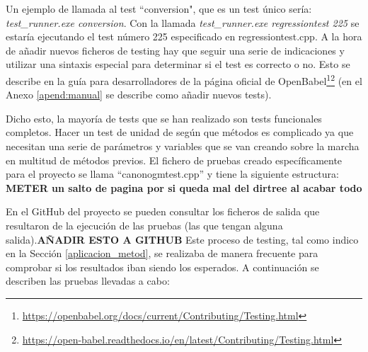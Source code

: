 Un ejemplo de llamada al test ``conversion", que es un test único sería: \textit{test\_runner.exe conversion}. Con la llamada \textit{test\_runner.exe regressiontest 225} se estaría ejecutando el test número 225 especificado en regressiontest.cpp. A la hora de añadir nuevos ficheros de testing hay que seguir una serie de indicaciones y utilizar una sintaxis especial para determinar si el test es correcto o no. Esto se describe en la guía para desarrolladores de la página oficial de OpenBabel\footnote{\url{https://openbabel.org/docs/current/Contributing/Testing.html}}\footnotecomma\footnote{\url{https://open-babel.readthedocs.io/en/latest/Contributing/Testing.html}} (en el Anexo \ref{apend:manual} se describe como añadir nuevos tests).

Dicho esto, la mayoría de tests que se han realizado son tests funcionales completos. Hacer un test de unidad de según que métodos es complicado ya que necesitan una serie de parámetros y variables que se van creando sobre la marcha en multitud de métodos previos. El fichero de pruebas creado específicamente para el proyecto se llama ``canonogmtest.cpp'' y tiene la siguiente estructura:
\textbf{METER un salto de pagina por si queda mal del dirtree al acabar todo}
\vspace{0.2cm}

En el GitHub del proyecto se pueden consultar los ficheros de salida que resultaron de la ejecución de las pruebas (las que tengan alguna salida).\textbf{AÑADIR ESTO A GITHUB} Este proceso de testing, tal como indico en la Sección \ref{aplicacion_metod}, se realizaba de manera frecuente para comprobar si los resultados iban siendo los esperados. A continuación se describen las pruebas llevadas a cabo:

